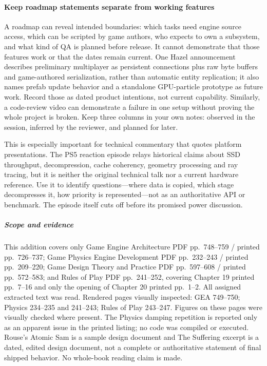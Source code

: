 \paragraph{Keep roadmap statements separate from working features}\label{06-engine-ii-ch041-keep-roadmap-statements-separate-from-working-features}

A roadmap can reveal intended boundaries: which tasks need engine source access, which can be scripted by game authors, who expects to own a subsystem, and what kind of QA is planned before release. It cannot demonstrate that those features work or that the dates remain current. One Hazel announcement describes preliminary multiplayer as persistent connections plus raw byte buffers and game-authored serialization, rather than automatic entity replication; it also names prefab update behavior and a standalone GPU-particle prototype as future work. Record those as dated product intentions, not current capability. Similarly, a code-review video can demonstrate a failure in one setup without proving the whole project is broken. Keep three columns in your own notes: observed in the session, inferred by the reviewer, and planned for later.

This is especially important for technical commentary that quotes platform presentations. The PS5 reaction episode relays historical claims about SSD throughput, decompression, cache coherency, geometry processing and ray tracing, but it is neither the original technical talk nor a current hardware reference. Use it to identify questions---where data is copied, which stage decompresses it, how priority is represented---not as an authoritative API or benchmark. The episode itself cuts off before its promised power discussion.

\subparagraph{Scope and evidence}\label{06-engine-ii-ch041-scope-and-evidence}

This addition covers only Game Engine Architecture PDF pp.~748--759 / printed pp.~726--737; Game Physics Engine Development PDF pp.~232--243 / printed pp.~209--220; Game Design Theory and Practice PDF pp.~597--608 / printed pp.~572--583; and Rules of Play PDF pp.~241--252, covering Chapter 19 printed pp.~7--16 and only the opening of Chapter 20 printed pp.~1--2. All assigned extracted text was read. Rendered pages visually inspected: GEA 749--750; Physics 234--235 and 241--243; Rules of Play 243--247. Figures on these pages were visually checked where present. The Physics damping repetition is reported only as an apparent issue in the printed listing; no code was compiled or executed. Rouse's Atomic Sam is a sample design document and The Suffering excerpt is a dated, edited design document, not a complete or authoritative statement of final shipped behavior. No whole-book reading claim is made.

